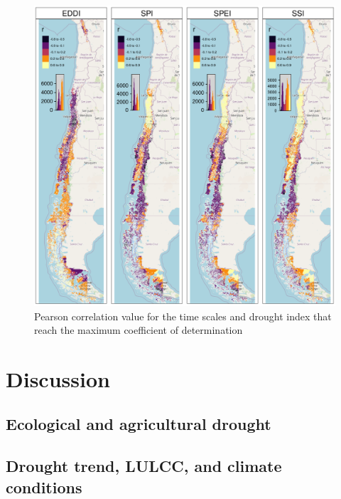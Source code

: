 \documentclass[
  authoryear,
  preprint,
  3p,
  onecolumn]{elsarticle}
\begin{document}
\begin{figure}[!ht]

{\centering \includegraphics{../output/figs/mapa_cor_r_indices_zcNDVI6.png}

}

\caption{\label{fig-corPerson}Pearson correlation value for the time
scales and drought index that reach the maximum coefficient of
determination}

\end{figure}

\hypertarget{discussion}{%
\section{Discussion}\label{discussion}}

\hypertarget{ecological-and-agricultural-drought}{%
\subsection{Ecological and agricultural
drought}\label{ecological-and-agricultural-drought}}

\hypertarget{drought-trend-lulcc-and-climate-conditions}{%
\subsection{Drought trend, LULCC, and climate
conditions}\label{drought-trend-lulcc-and-climate-conditions}}
\end{document}
